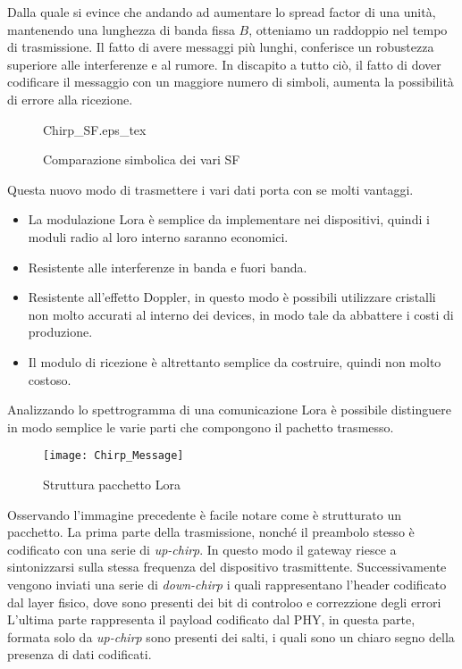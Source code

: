 Dalla quale si evince che andando ad aumentare lo spread factor di una unità,
mantenendo una lunghezza di banda fissa $B$, otteniamo un raddoppio nel tempo di
trasmissione. Il fatto di avere messaggi più lunghi, conferisce un robustezza
superiore alle interferenze e al rumore. In discapito a tutto ciò, il fatto di
dover codificare il messaggio con un maggiore numero di simboli, aumenta la
possibilità di errore alla ricezione. 

\begin{figure}[h]
\centering 
{Chirp_SF.eps_tex}
\caption{Comparazione simbolica dei vari SF}
\end{figure}

Questa nuovo modo di trasmettere i vari dati porta con se molti vantaggi.
\begin{itemize}
\item La modulazione Lora è semplice da implementare nei dispositivi, quindi i
moduli radio al loro interno saranno economici.
\item Resistente alle interferenze in banda e fuori banda.
\item Resistente  all'effetto Doppler, in questo modo è possibili utilizzare
cristalli non molto accurati al interno dei devices, in modo tale da abbattere i
costi di produzione.
\item Il modulo di ricezione è altrettanto semplice da costruire, quindi non
molto costoso.
\end{itemize}

Analizzando lo spettrogramma di una comunicazione Lora è possibile distinguere
in modo semplice le varie parti che compongono il pachetto trasmesso. 

\begin{figure}[h]
\centering 
\texttt{[image: Chirp\_Message]}
\caption{Struttura pacchetto Lora }
\end{figure}

Osservando l'immagine precedente è facile notare come è strutturato un pacchetto.
La prima parte della trasmissione, nonché il preambolo  stesso è codificato con una
serie di \emph{up-chirp}. In questo modo il gateway riesce a sintonizzarsi sulla
stessa frequenza del dispositivo trasmittente.
Successivamente vengono inviati una serie di
\emph{down-chirp} i quali rappresentano l'header codificato dal layer fisico,
dove sono presenti dei bit di controloo e correzzione degli errori
L'ultima parte rappresenta il payload codificato dal PHY, in questa parte,
formata solo da \emph{up-chirp} sono presenti dei salti, i quali sono un chiaro
segno della presenza di dati codificati.

